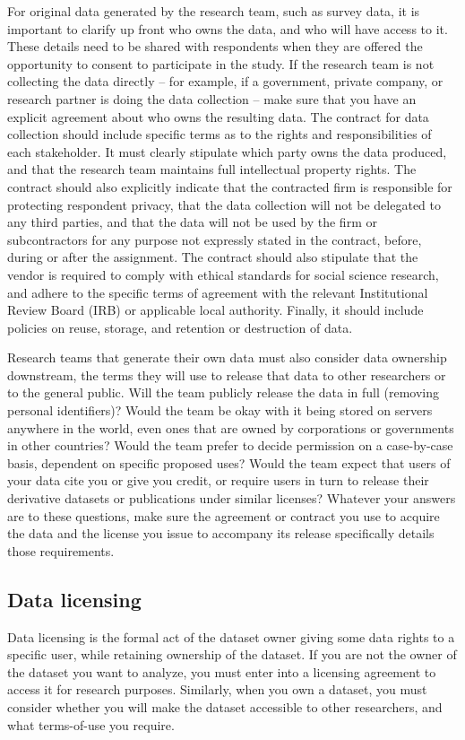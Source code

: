 For original data generated by the research team, such as survey data,
it is important to clarify up front who owns the data,
and who will have access to it.
These details need to be shared with respondents when they are offered the opportunity
to consent to participate in the study.
If the research team is not collecting the data directly --
for example, if a government, private company, or research partner is doing the data collection --
make sure that you have an explicit agreement
about who owns the resulting data.
The contract for data collection should include specific terms
as to the rights and responsibilities of each stakeholder.
It must clearly stipulate which party owns the data produced,
and that the research team maintains full intellectual property rights.
The contract should also explicitly indicate that the contracted firm
is responsible for protecting respondent privacy,
that the data collection will not be delegated to any third parties,
and that the data will not be used by the firm or subcontractors for any purpose not expressly stated in the contract,
before, during or after the assignment.
The contract should also stipulate that the vendor is required to comply with
ethical standards for social science research,
and adhere to the specific terms of agreement with the relevant
Institutional Review Board (IRB)
or applicable local authority.
Finally, it should include policies on reuse, storage, and retention or destruction of data.

Research teams that generate their own data must also consider data ownership downstream,
the terms they will use to release that data to other researchers or to the general public.
Will the team publicly release the data in full (removing personal identifiers)?
Would the team be okay with it being stored on servers anywhere in the world,
even ones that are owned by corporations or governments in other countries?
Would the team prefer to decide permission on a case-by-case basis, dependent on specific proposed uses?
Would the team expect that users of your data cite you or give you credit,
or require users in turn to release
their derivative datasets or publications under similar licenses?
Whatever your answers are to these questions,
make sure the agreement or contract
you use to acquire the data
and the license you issue to accompany its release
specifically details those requirements.

\subsection{Data licensing}
Data licensing is the formal act of the dataset owner
giving some data rights to a specific user,
while retaining ownership of the dataset.
If you are not the owner of the dataset you want to analyze,
you must enter into a licensing agreement to access it for research purposes.
Similarly, when you own a dataset,
you must consider whether you will make the dataset accessible to other researchers,
and what terms-of-use you require.

